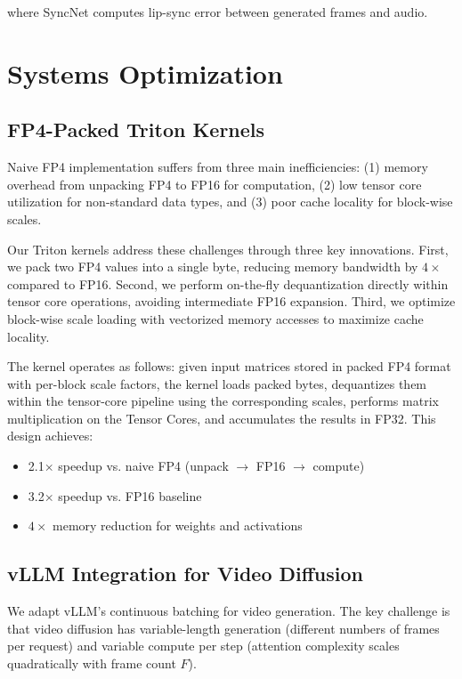\documentclass[journal,twoside]{IEEEtran}
\theoremstyle{definition}
\theoremstyle{remark}
\begin{document}
where SyncNet \cite{chung2019syncnet} computes lip-sync error between generated frames and audio.

\section{Systems Optimization}
\label{sec:systems}

\subsection{FP4-Packed Triton Kernels}

Naive FP4 implementation suffers from three main inefficiencies: (1) memory overhead from unpacking FP4 to FP16 for computation, (2) low tensor core utilization for non-standard data types, and (3) poor cache locality for block-wise scales.

Our Triton kernels address these challenges through three key innovations. First, we pack two FP4 values into a single byte, reducing memory bandwidth by $4\times$ compared to FP16. Second, we perform on-the-fly dequantization directly within tensor core operations, avoiding intermediate FP16 expansion. Third, we optimize block-wise scale loading with vectorized memory accesses to maximize cache locality.

The kernel operates as follows: given input matrices stored in packed FP4 format with per-block scale factors, the kernel loads packed bytes, dequantizes them within the tensor-core pipeline using the corresponding scales, performs matrix multiplication on the Tensor Cores, and accumulates the results in FP32. This design achieves:
\begin{itemize}
    \item 2.1$\times$ speedup vs. naive FP4 (unpack $\rightarrow$ FP16 $\rightarrow$ compute)
    \item 3.2$\times$ speedup vs. FP16 baseline
    \item $4\times$ memory reduction for weights and activations
\end{itemize}

\subsection{vLLM Integration for Video Diffusion}

We adapt vLLM's continuous batching for video generation. The key challenge is that video diffusion has variable-length generation (different numbers of frames per request) and variable compute per step (attention complexity scales quadratically with frame count $F$).
\end{document}
